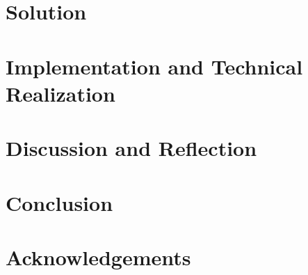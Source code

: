 \documentclass[12pt,                                          %
               a4paper,                                       %
               openany                                 %
              ]{report}                               %
\begin{document}
\chapter{Solution}                                             %
\label{chap:solution}                                          %


\chapter[Implementation]{Implementation and Technical Realization}
\label{chap:implementation}

   

\chapter{Discussion and Reflection}
\label{chap:discussion} 

    

\chapter{Conclusion}                                           %
\label{chap:conclusion} %



\chapter{Acknowledgements}                                           %
\end{document}
